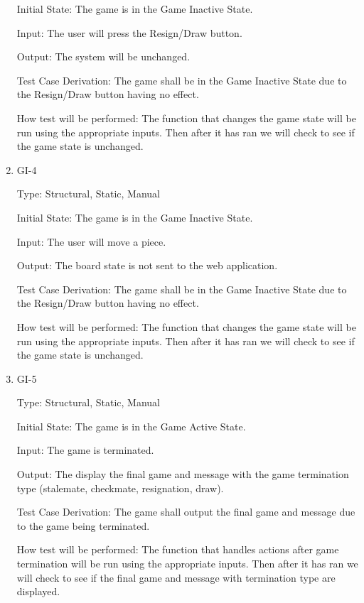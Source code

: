 \documentclass[12pt, titlepage]{article}
\begin{document}
\begin{enumerate}
  Initial State: The game is in the Game Inactive State.
                      
  Input: The user will press the Resign/Draw button.
                      
  Output: The system will be unchanged.
                      
  Test Case Derivation: The game shall be in the Game Inactive State due to the Resign/Draw button having no effect.
  
  How test will be performed: The function that changes the game state will be run using the appropriate inputs.
  Then after it has ran we will check to see if the game state is unchanged.

  \item{GI-4\\}

  Type: Structural, Static, Manual
                      
  Initial State: The game is in the Game Inactive State.
                      
  Input: The user will move a piece.
                      
  Output: The board state is not sent to the web application.
                      
  Test Case Derivation: The game shall be in the Game Inactive State due to the Resign/Draw button having no effect.
  
  How test will be performed: The function that changes the game state will be run using the appropriate inputs.
  Then after it has ran we will check to see if the game state is unchanged.

  \item{GI-5\\}

  Type: Structural, Static, Manual
                      
  Initial State: The game is in the Game Active State.
                      
  Input: The game is terminated.
                      
  Output: The display the final game and message with the game termination type (stalemate,
  checkmate, resignation, draw).
                      
  Test Case Derivation: The game shall output the final game and message due to the game being terminated.
  
  How test will be performed: The function that handles actions after game termination will be run using the appropriate inputs.
  Then after it has ran we will check to see if the final game and message with termination type are displayed.

  \end{enumerate}
\end{document}
